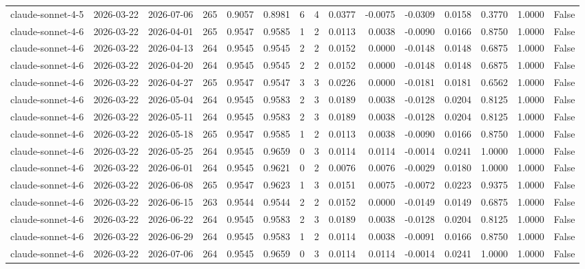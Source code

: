 \begin{table}
\begin{tabular}{lllrrrrrrrrrrrr}
claude-sonnet-4-5 & 2026-03-22 & 2026-07-06 & 265 & 0.9057 & 0.8981 & 6 & 4 & 0.0377 & -0.0075 & -0.0309 & 0.0158 & 0.3770 & 1.0000 & False \\
claude-sonnet-4-6 & 2026-03-22 & 2026-04-01 & 265 & 0.9547 & 0.9585 & 1 & 2 & 0.0113 & 0.0038 & -0.0090 & 0.0166 & 0.8750 & 1.0000 & False \\
claude-sonnet-4-6 & 2026-03-22 & 2026-04-13 & 264 & 0.9545 & 0.9545 & 2 & 2 & 0.0152 & 0.0000 & -0.0148 & 0.0148 & 0.6875 & 1.0000 & False \\
claude-sonnet-4-6 & 2026-03-22 & 2026-04-20 & 264 & 0.9545 & 0.9545 & 2 & 2 & 0.0152 & 0.0000 & -0.0148 & 0.0148 & 0.6875 & 1.0000 & False \\
claude-sonnet-4-6 & 2026-03-22 & 2026-04-27 & 265 & 0.9547 & 0.9547 & 3 & 3 & 0.0226 & 0.0000 & -0.0181 & 0.0181 & 0.6562 & 1.0000 & False \\
claude-sonnet-4-6 & 2026-03-22 & 2026-05-04 & 264 & 0.9545 & 0.9583 & 2 & 3 & 0.0189 & 0.0038 & -0.0128 & 0.0204 & 0.8125 & 1.0000 & False \\
claude-sonnet-4-6 & 2026-03-22 & 2026-05-11 & 264 & 0.9545 & 0.9583 & 2 & 3 & 0.0189 & 0.0038 & -0.0128 & 0.0204 & 0.8125 & 1.0000 & False \\
claude-sonnet-4-6 & 2026-03-22 & 2026-05-18 & 265 & 0.9547 & 0.9585 & 1 & 2 & 0.0113 & 0.0038 & -0.0090 & 0.0166 & 0.8750 & 1.0000 & False \\
claude-sonnet-4-6 & 2026-03-22 & 2026-05-25 & 264 & 0.9545 & 0.9659 & 0 & 3 & 0.0114 & 0.0114 & -0.0014 & 0.0241 & 1.0000 & 1.0000 & False \\
claude-sonnet-4-6 & 2026-03-22 & 2026-06-01 & 264 & 0.9545 & 0.9621 & 0 & 2 & 0.0076 & 0.0076 & -0.0029 & 0.0180 & 1.0000 & 1.0000 & False \\
claude-sonnet-4-6 & 2026-03-22 & 2026-06-08 & 265 & 0.9547 & 0.9623 & 1 & 3 & 0.0151 & 0.0075 & -0.0072 & 0.0223 & 0.9375 & 1.0000 & False \\
claude-sonnet-4-6 & 2026-03-22 & 2026-06-15 & 263 & 0.9544 & 0.9544 & 2 & 2 & 0.0152 & 0.0000 & -0.0149 & 0.0149 & 0.6875 & 1.0000 & False \\
claude-sonnet-4-6 & 2026-03-22 & 2026-06-22 & 264 & 0.9545 & 0.9583 & 2 & 3 & 0.0189 & 0.0038 & -0.0128 & 0.0204 & 0.8125 & 1.0000 & False \\
claude-sonnet-4-6 & 2026-03-22 & 2026-06-29 & 264 & 0.9545 & 0.9583 & 1 & 2 & 0.0114 & 0.0038 & -0.0091 & 0.0166 & 0.8750 & 1.0000 & False \\
claude-sonnet-4-6 & 2026-03-22 & 2026-07-06 & 264 & 0.9545 & 0.9659 & 0 & 3 & 0.0114 & 0.0114 & -0.0014 & 0.0241 & 1.0000 & 1.0000 & False \\

\end{tabular}
\end{table}
